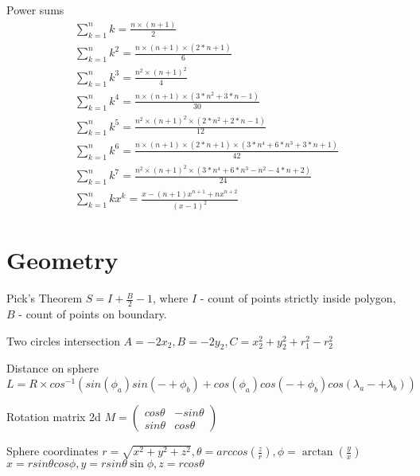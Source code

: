 \documentclass[landscape, 10pt, a4paper, oneside, twocolumn]{extarticle}
\begin{document}
\Formula
{Power sums}
{
    \begin{gather}
        \sum_{k=1}^{n} k = \frac{n \times (n + 1)}{2} \\
        \sum_{k=1}^{n} k^{2} = \frac{n \times (n + 1) \times (2 * n + 1)}{6} \\
        \sum_{k=1}^{n} k^{3} = \frac{n^{2} \times (n + 1)^2}{4} \\
        \sum_{k=1}^{n} k^{4} = \frac{n \times (n + 1) \times (3 * n^{2} + 3 * n - 1)}{30} \\
        \sum_{k=1}^{n} k^{5} = \frac{n^{2} \times (n + 1)^{2} \times (2 * n^{2} + 2 * n - 1)}{12} \\
        \sum_{k=1}^{n} k^{6} = \frac{n \times (n + 1) \times (2 * n + 1) \times (3 * n^{4} + 6 * n^{3} + 3 * n + 1)}{42} \\
        \sum_{k=1}^{n} k^{7} = \frac{n^{2} \times (n + 1)^{2} \times (3 * n^{4} + 6 * n^{3} - n^{2} - 4 * n + 2)}{24} \\
        \sum_{k=1}^{n} k x^{k} = \frac{x - (n + 1) x^{n + 1} + n x^{n + 2}}{(x - 1)^{2}}
    \end{gather}
}

\section{Geometry}

\Formula
{Pick's Theorem}
{$S = I + \frac{B}{2} - 1$, where $I$ - count of points strictly inside polygon, $B$ - count of points on boundary.}

\Formula
{Two circles intersection}
{$A = -2 x_{2}, B = - 2 y_{2}, C = x_{2}^{2} + y_{2}^{2} + r_{1}^{2} - r_{2}^{2}$}

\Formula
{Distance on sphere}
{$L = R \times cos^{-1}( sin(\phi_{a}) sin(-+ \phi_{b}) + cos(\phi_{a}) cos(-+ \phi_{b}) cos(\lambda_{a} -+ \lambda_{b}) ) $}

\Formula
{Rotation matrix 2d}
{$M = \left( \begin{smallmatrix} cos\theta & - sin\theta \\ sin\theta & cos\theta \end{smallmatrix} \right)$}

\Formula
{Sphere coordinates}
{
    $r = \sqrt{x^{2} + y^{2} + z^{2}}, \theta = arccos(\frac{z}{r}), \phi = \arctan(\frac{y}{x})$ \\
    $x = r sin \theta cos \phi, y = r sin \theta \sin \phi, z = r cos \theta$ \\ 
}    
\end{document}
